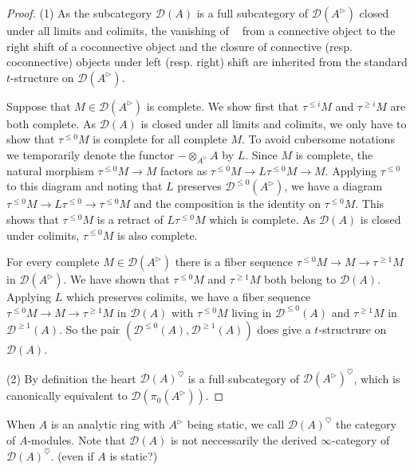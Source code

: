 \documentclass{article}
\theoremstyle{plain}
\theoremstyle{definition}
\theoremstyle{remark}
\DeclareMathOperator{\rhoms}{\underline{RHom}}
\newcommand{\huflag}{\triangleright}
\newcommand{\D}{\mathcal{D}}
\newcommand{\heart}{\heartsuit}
\begin{document}
\begin{proof}
(1)
As the subcategory $ \D (A) $ is a full subcategory of $ \D (A ^{\huflag}) $ closed under all limits and colimits,
the vanishing of $ \rhoms $ from a connective object to the right shift of a coconnective object
and the closure of connective (resp. coconnective) objects under left (resp. right) shift
are inherited from the standard $ t $-structure on $ \D (A ^{\huflag}) $.

Suppose that $ M \in \D (A ^{\huflag}) $ is complete. We show first that $ \tau ^{\leq i} M $ and $ \tau ^{\geq i}M $ are both complete.
As $ \D (A) $ is closed under all limits and colimits, we only have to show that $ \tau ^{\leq 0}M $ is complete for all complete $ M $.
To avoid cubersome notations we temporarily denote the functor $ -\otimes _{A ^{\huflag}} A $ by $ L $.
Since $ M $ is complete, the natural morphism $ \tau ^{\leq 0}M\to M $ factors as $ \tau ^{\leq 0}M\to L \tau ^{\leq 0}M\to M $.
Applying $ \tau ^{\leq 0} $ to this diagram and noting that $ L $ preserves $ \D ^{\leq 0} (A ^{\huflag}) $,
we have a diagram $ \tau ^{\leq 0}M\to L \tau ^{\leq 0}\to \tau ^{\leq 0}M $ and the composition is the identity on $ \tau ^{\leq 0} M $.
This shows that $ \tau ^{\leq 0}M $ is a retract of $ L \tau ^{\leq 0}M $ which is complete.
As $ \D (A) $ is closed under colimits, $ \tau ^{\leq 0}M $ is also complete.

For every complete $ M\in \D (A ^{\huflag}) $ there is a fiber sequence
$ \tau ^{\leq 0}M\to M\to \tau ^{\geq 1}M $ in $ \D (A ^{\huflag}) $.
We have shown that $ \tau ^{\leq 0}M $ and $ \tau ^{\geq 1}M $ both belong to $ \D (A) $.
Applying $ L $ which preserves colimits, we have a fiber sequence
$ \tau ^{\leq 0}M\to M\to \tau ^{\geq 1}M $ in $ \D (A) $
with $ \tau ^{\leq 0}M $ living in $ \D ^{\leq 0}(A) $ and $ \tau ^{\geq 1}M $ in $ \D ^{\geq 1}(A) $.
So the pair $ (\D ^{\leq 0}(A), \D ^{\geq 1}(A)) $ does give a $ t $-structrure on $ \D (A) $.

(2)
By definition the heart $ \D (A)^{\heart} $ is a full subcategory of $ \D (A ^{\huflag})^{\heart} $, which is canonically equivalent to 
$ \D (\pi _{0}(A ^{\huflag})) $.

\end{proof}

When $ A $ is an analytic ring with $ A ^{\huflag} $ being static,
we call $ \D(A)^{\heart} $ the category of $ A $-modules.
Note that $ \D (A) $ is not neccessarily the derived $ \infty $-category of $ \D (A)^{\heart} $.
(even if $ A $ is static?)
\end{document}
